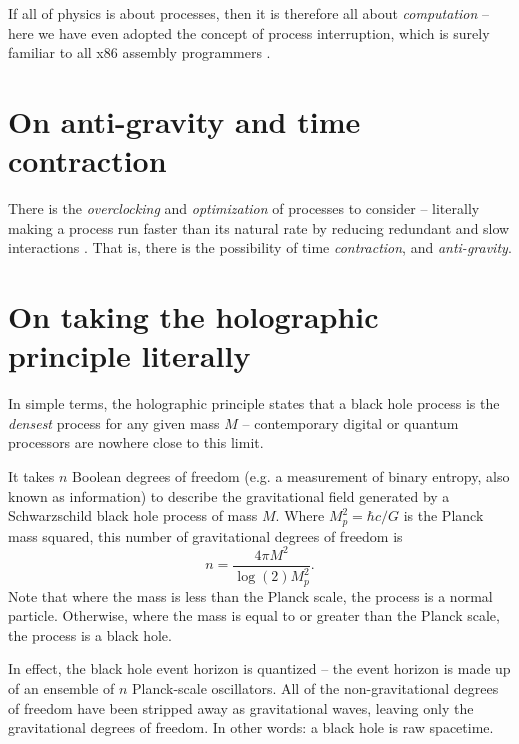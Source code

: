\documentclass[12pt]{article}
\begin{document}
If all of physics is about processes, then it is therefore all about {\textit{computation}} \cite{zuse, wolfram} -- here we have even adopted the concept of process interruption, which is surely familiar to all x86 assembly programmers \cite{abrash}.







\section{On anti-gravity and time contraction}

There is the {\textit{overclocking}} and {\textit{optimization}} of processes to consider -- literally making a process run faster than its natural rate by reducing redundant and slow interactions \cite{wainner, mcconnell, pikus}.
That is, there is the possibility of time {\textit{contraction}}, and {\textit{anti-gravity}}.






\section{On taking the holographic principle literally}

In simple terms, the holographic principle states that a black hole process is the {\textit{densest}} process for any given mass $M$ -- contemporary digital or quantum processors are nowhere close to this limit.

It takes $n$ Boolean degrees of freedom (e.g. a measurement of binary entropy, also known as information) to describe the gravitational field \cite{hooft, susskind, bousso} generated by a Schwarzschild black hole process of mass $M$.
Where $M_p^2 = \hbar c / G$ is the Planck mass squared, this number of gravitational degrees of freedom is
\begin{equation}
n = \frac{4\pi M^2}{ \log(2) M_p^2}.
\end{equation}
Note that where the mass is less than the Planck scale, the process is a normal particle.
Otherwise, where the mass is equal to or greater than the Planck scale, the process is a black hole.

In effect, the black hole event horizon is quantized -- the event horizon is made up of an ensemble of $n$ Planck-scale oscillators.
All of the non-gravitational degrees of freedom have been stripped away as gravitational waves, leaving only the gravitational degrees of freedom.
In other words: a black hole is raw spacetime.
\end{document}

